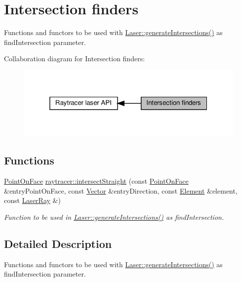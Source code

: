 \hypertarget{group__intersectionFinders}{}\section{Intersection finders}
\label{group__intersectionFinders}


Functions and functors to be used with \hyperlink{classraytracer_1_1Laser_a40fd2b112fb1de646861d7e93ac303e3}{Laser\+::generate\+Intersections()} as find\+Intersection parameter.  


Collaboration diagram for Intersection finders\+:
\nopagebreak
\begin{figure}[H]
\begin{center}
\leavevmode
\includegraphics[width=319pt]{group__intersectionFinders}
\end{center}
\end{figure}
\subsection*{Functions}
\begin{DoxyCompactItemize}
\item 
\hyperlink{structraytracer_1_1PointOnFace}{Point\+On\+Face} \hyperlink{group__intersectionFinders_ga88bd3438a657bdf333afdd59cd675798}{raytracer\+::intersect\+Straight} (const \hyperlink{structraytracer_1_1PointOnFace}{Point\+On\+Face} \&entry\+Point\+On\+Face, const \hyperlink{classraytracer_1_1Vector}{Vector} \&entry\+Direction, const \hyperlink{classraytracer_1_1Element}{Element} \&element, const \hyperlink{classraytracer_1_1LaserRay}{Laser\+Ray} \&)
\begin{DoxyCompactList}\small\item\em Function to be used in \hyperlink{classraytracer_1_1Laser_a40fd2b112fb1de646861d7e93ac303e3}{Laser\+::generate\+Intersections()} as find\+Intersection. \end{DoxyCompactList}\end{DoxyCompactItemize}


\subsection{Detailed Description}
Functions and functors to be used with \hyperlink{classraytracer_1_1Laser_a40fd2b112fb1de646861d7e93ac303e3}{Laser\+::generate\+Intersections()} as find\+Intersection parameter. 



